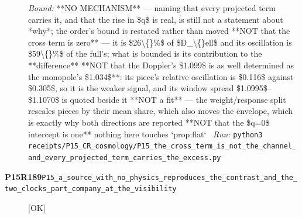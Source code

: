 \begin{description}
 \emph{Bound:}  **NO MECHANISM** --- naming that every projected term carries it, and that the rise in \$q\$ is real, is still not a statement about *why*; the order's bound is restated rather than moved  **NOT that the cross term is zero** --- it is \$26\textbackslash\{\}\%\$ of \$D\_\textbackslash\{\}ell\$ and its oscillation is \$59\textbackslash\{\}\%\$ of the full's; what is bounded is its contribution to the **difference**  **NOT that the Doppler's \$1.099\$ is as well determined as the monopole's \$1.034\$**: its piece's relative oscillation is \$0.116\$ against \$0.305\$, so it is the weaker signal, and its window spread \$1.0995\$--\$1.1070\$ is quoted beside it  **NOT a fit** --- the weight/response split rescales pieces by their mean share, which also moves the envelope, which is exactly why both directions are reported  **NOT that the \$q=0\$ intercept is one**  nothing here touches `prop:flat`
\ \emph{Run:} \texttt{python3 receipts/P15\_CR\_cosmology/P15\_the\_cross\_term\_is\_not\_the\_channel\_and\_every\_projected\_term\_carries\_the\_excess.py}
\item[\rcptlabel{P15_a_source_with_no_physics_reproduces_the_contrast_and_the_two_clocks_part_company_at_the_visibility}{P15R189}\textbf{P15R189}\quad\texttt{P15\_a\_source\_with\_no\_physics\_reproduces\_the\_contrast\_and\_the\_two\_clocks\_part\_company\_at\_the\_visibility}]\hfill\textsf{[OK]}\\

\end{description}
